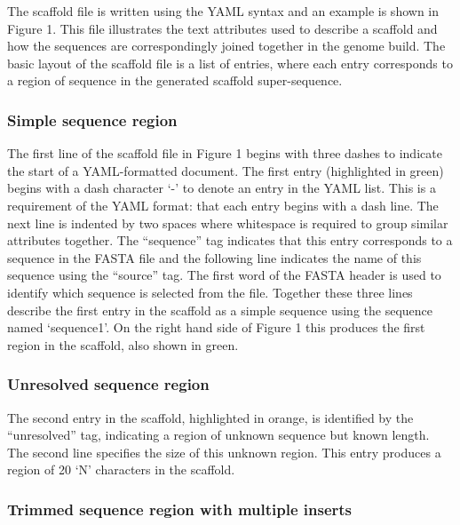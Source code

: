 \documentclass[10pt]{bmc_article}
\newenvironment{bmcformat}{\begin{raggedright}\baselineskip20pt\sloppy\setboolean{publ}{false}}{\end{raggedright}\baselineskip20pt\sloppy}
\begin{document}
\begin{bmcformat}
The scaffold file is written using the YAML syntax and an example is shown in
Figure 1. This file illustrates the text attributes used to describe
a scaffold and how the sequences are correspondingly joined together in the
genome build. The basic layout of the scaffold file is a list of entries,
where each entry corresponds to a region of sequence in the generated scaffold
super-sequence.  \pb

\subsubsection*{Simple sequence region} %

The first line of the scaffold file in Figure 1 begins with three dashes to
indicate the start of a YAML-formatted document. The first entry (highlighted
in green) begins with a dash character `-' to denote an entry in the YAML
list. This is a requirement of the YAML format: that each entry begins with
a dash line. The next line is indented by two spaces where whitespace is
required to group similar attributes together. The ``sequence'' tag indicates
that this entry corresponds to a sequence in the FASTA file and the following
line indicates the name of this sequence using the ``source'' tag. The first
word of the FASTA header is used to identify which sequence is selected from
the file. Together these three lines describe the first entry in the scaffold
as a simple sequence using the sequence named `sequence1'. On the right hand
side of Figure 1 this produces the first region in the scaffold, also shown in green. \pb

\subsubsection*{Unresolved sequence region} %

The second entry in the scaffold, highlighted in orange, is identified by the
``unresolved'' tag, indicating a region of unknown sequence but known length.
The second line specifies the size of this unknown region. This entry produces
a region of 20 `N' characters in the scaffold. \pb

\subsubsection*{Trimmed sequence region with multiple inserts} %


\end{bmcformat}
\end{document}
